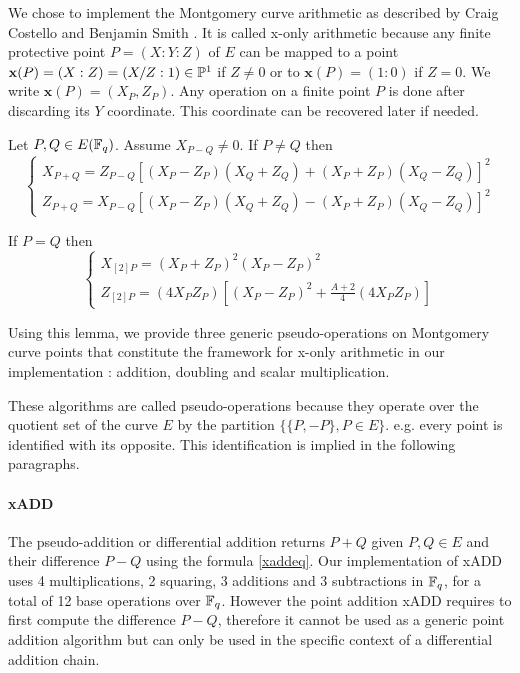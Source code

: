 \documentclass[../main.tex]{subfilesubs}
\begin{document}
\newcommand{\x}{\textbf{x}}
\newcommand{\funct}[1]{\texttt{\detokenize{#1}}}
We chose to implement  the Montgomery curve arithmetic as described by Craig Costello and Benjamin Smith \cite{}.
It is called x-only arithmetic because any finite protective point $P = (X:Y:Z)$ of $E$ can be mapped to a point $\x(P)=(X:Z)=(X/Z:1)\in\PP^1$ if $Z\neq0$ or to $\x(P)=(1:0)$ if $Z=0$. We write $\x(P)=(X_P, Z_P)$.
Any operation on a finite point $P$ is done after discarding its $Y$ coordinate. This coordinate can be recovered later if needed.

\begin{lemma}Let $P,Q\in E(\mathbb{F}_q)$.  Assume $X_{P-Q}\neq0$.
	 If $P\neq Q$ then  \begin{equation}\label{xaddeq}\left\{\begin{array}{l}
	 	X_{P+Q} = Z_{P-Q}[(X_P-Z_P)(X_Q+Z_Q) + (X_P+Z_P)(X_Q-Z_Q)]^2\\
	 	Z_{P+Q} = X_{P-Q}[(X_P-Z_P)(X_Q+Z_Q) - (X_P+Z_P)(X_Q-Z_Q)]^2
	 \end{array}\right.\end{equation}

 	If $P=Q$ then \begin{equation}\label{xdbleq}\left\{\begin{array}{l}
 		X_{[2]P}=(X_P + Z_P)^2(X_P - Z_P)^2 \\
 		Z_{[2]P}=(4 X_P Z_P)[(X_P - Z_P)^2 + \frac{A+2}{4}(4 X_P Z_P)]
 	\end{array}\right.\end{equation}
\end{lemma}

Using this lemma, we provide three generic pseudo-operations on Montgomery curve points that constitute the framework for x-only arithmetic in our implementation : addition, doubling and scalar multiplication.

These algorithms are called pseudo-operations because they operate over the quotient set of the curve $E$ by the partition
$\lbrace\lbrace P, -P\rbrace, P\in E\rbrace$. e.g. every point is identified with its opposite. This identification is implied in the following paragraphs.

\paragraph{xADD}The pseudo-addition or differential addition \funct{MG_xADD} returns $P+Q$ given $P,Q\in E$ and their difference $P-Q$ using the formula \eqref{xaddeq}.
Our implementation of xADD uses 4 multiplications, 2 squaring,  3 additions and 3 subtractions in $\mathbb{F}_q$, for a total of  12 base operations over $\mathbb{F}_q$.
However the point addition xADD requires to first compute the difference $P-Q$, therefore it cannot be used as a generic point addition algorithm but can only be used in the specific context of a differential addition chain.
\end{document}
